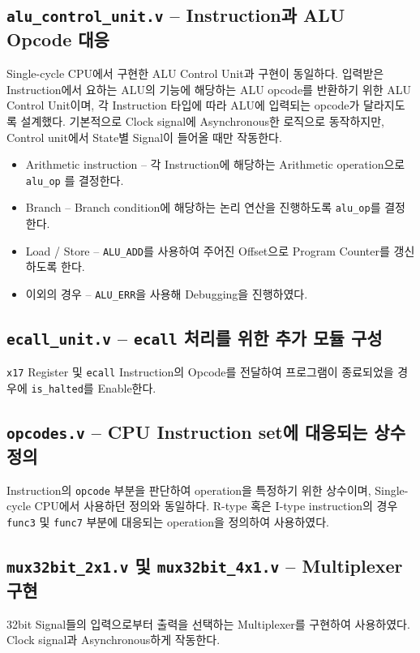 \documentclass{scrartcl}
\begin{document}
\subsection{\texttt{alu\_control\_unit.v} -- Instruction과 ALU Opcode 대응}
Single-cycle CPU에서 구현한 ALU Control Unit과 구현이 동일하다. 입력받은 Instruction에서 요하는
ALU의 기능에 해당하는 ALU opcode를 반환하기 위한 ALU Control Unit이며, 각 Instruction 타입에 따라
ALU에 입력되는 opcode가 달라지도록 설계했다. 기본적으로 Clock signal에 Asynchronous한 로직으로 동작하지만,
Control unit에서 State별 Signal이 들어올 때만 작동한다.
\begin{itemize}
  \item Arithmetic instruction -- 각 Instruction에 해당하는 Arithmetic operation으로 \texttt{alu\_op} 를 결정한다.
  \item Branch -- Branch condition에 해당하는 논리 연산을 진행하도록 \texttt{alu\_op}를 결정한다.
  \item Load / Store -- \texttt{ALU\_ADD}를 사용하여 주어진 Offset으로 Program Counter를 갱신하도록 한다.
  \item 이외의 경우 -- \texttt{ALU\_ERR}을 사용해 Debugging을 진행하였다.
\end{itemize}

\subsection{\texttt{ecall\_unit.v} -- \texttt{ecall} 처리를 위한 추가 모듈 구성}
\texttt{x17} Register 및 \texttt{ecall} Instruction의 Opcode를 전달하여 프로그램이 종료되었을 경우에
\texttt{is\_halted}를 Enable한다.

\subsection{\texttt{opcodes.v} -- CPU Instruction set에 대응되는 상수 정의}
Instruction의 \texttt{opcode} 부분을 판단하여 operation을 특정하기 위한 상수이며, Single-cycle CPU에서 사용하던 정의와 동일하다.
R-type 혹은 I-type instruction의 경우 \texttt{func3} 및 \texttt{func7} 부분에 대응되는 operation을 정의하여 사용하였다.

\subsection{\texttt{mux32bit\_2x1.v} 및 \texttt{mux32bit\_4x1.v} -- Multiplexer 구현}
32bit Signal들의 입력으로부터 출력을 선택하는 Multiplexer를 구현하여 사용하였다. Clock signal과 Asynchronous하게 작동한다.
\end{document}
